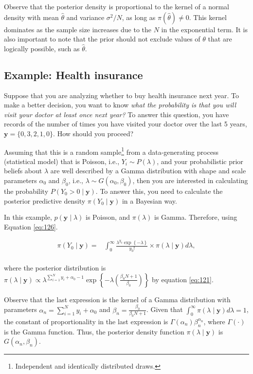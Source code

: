Observe that the posterior density is proportional to the kernel of a normal density with mean $\hat{\theta}$ and variance $\sigma^2 / N$, as long as $\pi(\hat{\theta}) \neq 0$. This kernel dominates as the sample size increases due to the $N$ in the exponential term. It is also important to note that the prior should not exclude values of $\theta$ that are logically possible, such as $\hat{\theta}$.

\subsection{Example: Health insurance}\label{sec121}
Suppose that you are analyzing whether to buy health insurance next year. To make a better decision, you want to know \textit{what the probability is that you will visit your doctor at least once next year?} To answer this question, you have records of the number of times you have visited your doctor over the last 5 years, \( \mathbf{y} = \{0, 3, 2, 1, 0\} \). How should you proceed?

Assuming that this is a random sample\footnote{Independent and identically distributed draws.} from a data-generating process (statistical model) that is Poisson, i.e., \( Y_i \sim P(\lambda) \), and your probabilistic prior beliefs about \( \lambda \) are well described by a Gamma distribution with shape and scale parameters \( \alpha_0 \) and \( \beta_0 \), i.e., \( \lambda \sim G(\alpha_0, \beta_0) \), then you are interested in calculating the probability \( P(Y_0 > 0 \mid \mathbf{y}) \). To answer this, you need to calculate the posterior predictive density \( \pi(Y_0 \mid \mathbf{y}) \) in a Bayesian way.

In this example, \( p(\mathbf{y} \mid \lambda) \) is Poisson, and \( \pi(\lambda) \) is Gamma. Therefore, using Equation \ref{eq:126}.


\begin{align*}
	\pi(Y_0\mid \mathbf{y})=&\int_{0}^{\infty}\frac{\lambda^{y_0}\exp\left\{-\lambda\right\}}{y_0!}\times \pi(\lambda\mid \mathbf{y})d\lambda,\\
\end{align*}

where the posterior distribution is $\pi(\lambda\mid \mathbf{y})\propto \lambda^{\sum_{i=1}^N y_i + \alpha_0 - 1}\exp\left\{-\lambda\left(\frac{\beta_0 N+1}{\beta_0}\right)\right\}$ by equation \ref{eq:121}.

Observe that the last expression is the kernel of a Gamma distribution with parameters \( \alpha_n = \sum_{i=1}^N y_i + \alpha_0 \) and \( \beta_n = \frac{\beta_0}{\beta_0 N + 1} \). Given that \( \int_0^{\infty} \pi(\lambda \mid \mathbf{y}) d\lambda = 1 \), the constant of proportionality in the last expression is \( \Gamma(\alpha_n) \beta_n^{\alpha_n} \), where \( \Gamma(\cdot) \) is the Gamma function. Thus, the posterior density function \( \pi(\lambda \mid \mathbf{y}) \) is \( G(\alpha_n, \beta_n) \).

